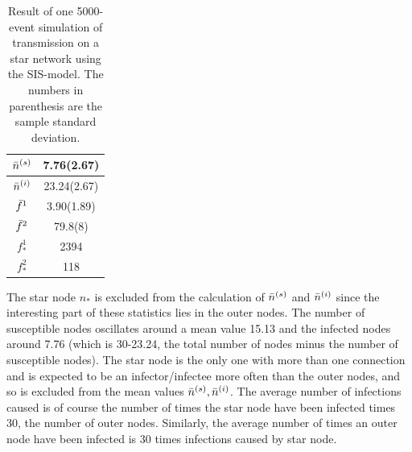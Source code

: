 \documentclass[12pt]{article} %
\numberwithin{equation}{section}
\begin{document}
\begin{table}[H]
    \centering
\begin{tabular}{c c}
     $\Bar{n}^{(s)}$ &7.76(2.67) \\ \hline 
     $\Bar{n}^{(i)}$ &23.24(2.67) \\ \hline
     $\Bar{f}^1$& 3.90(1.89) \\ \hline
     $\Bar{f}^2$&  79.8(8) \\ \hline
     $f^1_*$&  2394 \\ \hline
     $f^2_*$&  118
\end{tabular}
    \caption{Result of one 5000-event simulation of transmission on a star network using the SIS-model. The numbers in parenthesis are the sample standard deviation.}
    \label{table:sisstar}
\end{table}
The star node $n_*$ is excluded from the calculation of $\Bar{n}^{(s)}$ and $\Bar{n}^{(i)}$ since the interesting part of these statistics lies in the outer nodes.
The number of susceptible nodes oscillates around a mean value 15.13 and the infected nodes around 7.76 (which is 30-23.24, the total number of nodes minus the number of susceptible nodes). The star node is the only one with more than one connection and is expected to be an infector/infectee more often than the outer nodes, and so is excluded from the mean values $\Bar{n}^{(s)}, \Bar{n}^{(i)}$. The average number of infections caused is of course the number of times the star node have been infected times 30, the number of outer nodes. Similarly, the average number of times an outer node have been infected is 30 times infections caused by star node.
\FloatBarrier
\end{document}
